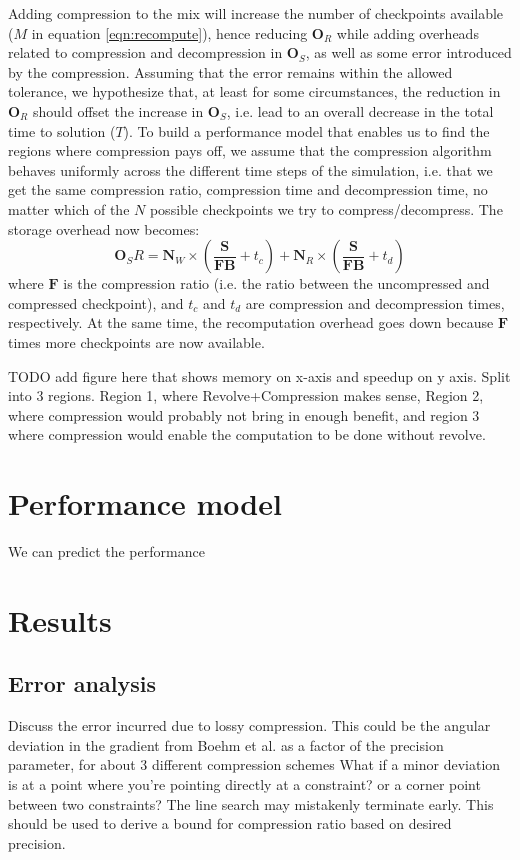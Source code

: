 \documentclass[conference]{IEEEtran}
\begin{document}
Adding compression to the mix will increase the number of checkpoints available ($M$ in equation \ref{eqn:recompute}),
hence reducing $\mathbf{O}_R$ while adding overheads related to compression and decompression in $\mathbf{O}_S$,
as well as some error introduced by the compression. Assuming that the error remains within the allowed tolerance,
we hypothesize that, at least for some circumstances, the reduction in $\mathbf{O}_R$ should offset the increase in 
$\mathbf{O}_S$, i.e. lead to an overall decrease in the total time to solution ($T$). To build a performance model that
enables us to find the regions where compression pays off, we assume that the compression algorithm behaves uniformly
across the different time steps of the simulation, i.e. that we get the same compression ratio, compression time and 
decompression time, no matter which of the $N$ possible checkpoints we try to compress/decompress. The storage overhead
now becomes:
\begin{equation}
\mathbf{O}_SR = \mathbf{N}_W \times (\frac{\mathbf{S}}{\mathbf{F}\mathbf{B}} + t_c) + \mathbf{N}_R \times (\frac{\mathbf{S}}{\mathbf{F}\mathbf{B}} + t_d)
\end{equation}
where $\mathbf{F}$ is the compression ratio (i.e. the ratio between the uncompressed and compressed checkpoint), and $t_c$
and $t_d$ are compression and decompression times, respectively. At the same time, the recomputation overhead goes down
because $\mathbf{F}$ times more checkpoints are now available.


TODO add figure here that shows memory on x-axis and speedup on y axis. Split into 3 regions. Region 1, 
where Revolve+Compression makes sense, Region 2, where compression would probably not bring in enough benefit, 
and region 3 where compression would enable the computation to be done without revolve. 
\section{Performance model}
We can predict the performance
\section{Results}
\subsection{Error analysis}
Discuss the error incurred due to lossy compression. This could be the
angular deviation in the gradient from Boehm et al. as a factor of the
precision parameter, for about 3 different compression schemes  What if a minor
deviation is at a point where you're pointing directly at a
constraint? or a corner point between two constraints? The line search
may mistakenly terminate early. This should be used to derive a bound
for compression ratio based on desired precision. 
\end{document}
